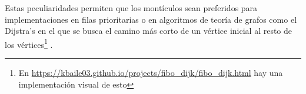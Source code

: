 \documentclass[paper=leter, fontsize=11pt]{scrartcl}
\numberwithin{equation}{section}		%
\numberwithin{figure}{section}			%
\numberwithin{table}{section}				%
\begin{document}
Estas peculiaridades permiten que los montículos sean preferidos para implementaciones en filas prioritarias o en algoritmos de teoría de grafos como el Dijstra's en el que se busca el camino más corto de un vértice inicial al resto de los vértices\footnote{En \url{https://kbaile03.github.io/projects/fibo_dijk/fibo_dijk.html} hay una implementación visual de esto} \cite{binary_heap}.





\end{document}
